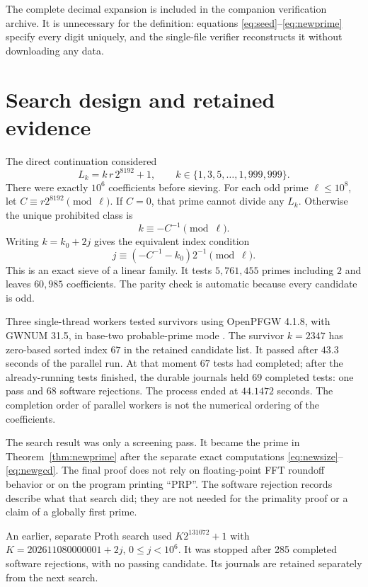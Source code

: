 \documentclass[11pt,a4paper]{article}
\theoremstyle{definition}\newtheorem{definition}[theorem]{Definition}
\theoremstyle{remark}\newtheorem{remark}[theorem]{Remark}
\begin{document}
The complete decimal expansion is included in the companion verification
archive. It is unnecessary for the definition: equations
\eqref{eq:seed}--\eqref{eq:newprime} specify every digit uniquely, and the
single-file verifier reconstructs it without downloading any data.



\section{Search design and retained evidence}\label{sec:search}
The direct continuation considered
\[
 L_k=k\,r\,2^{8192}+1,\qquad
 k\in\{1,3,5,\ldots,1,999,999\}.
\]
There were exactly $10^6$ coefficients before sieving. For each odd prime
$\ell\leq10^8$, let $C\equiv r2^{8192}\pmod\ell$. If $C=0$, that
prime cannot divide any $L_k$. Otherwise the unique prohibited class is
\[
 k\equiv-C^{-1}\pmod\ell.
\]
Writing $k=k_0+2j$ gives the equivalent index condition
\[
 j\equiv(-C^{-1}-k_0)2^{-1}\pmod\ell.
\]
This is an exact sieve of a linear family. It tests $5,761,455$ primes
including $2$ and leaves $60,985$ coefficients. The parity check is
automatic because every candidate is odd.

Three single-thread workers tested survivors using OpenPFGW 4.1.8, with
GWNUM 31.5, in base-two probable-prime mode \cite{pfgw}. The survivor
$k=2347$ has zero-based sorted index $67$ in the retained candidate list.
It passed after $43.3$ seconds of the parallel run. At that moment $67$
tests had completed; after the already-running tests finished, the durable
journals held $69$ completed tests: one pass and $68$ software rejections.
The process ended at $44.1472$ seconds. The completion order of parallel
workers is not the numerical ordering of the coefficients.

The search result was only a screening pass. It became the prime in
Theorem~\ref{thm:newprime} after the separate exact computations
\eqref{eq:newsize}--\eqref{eq:newgcd}. The final proof does not rely on
floating-point FFT roundoff behavior or on the program printing ``PRP''.
The software rejection records describe what that search did; they are
not needed for the primality proof or a claim of a globally first prime.

An earlier, separate Proth search used $K2^{131072}+1$ with $K=202611080000001+2j$, $0\leq j<10^6$. It was stopped after 285 completed software rejections, with no passing candidate. Its journals are retained separately from the next search.
\end{document}
